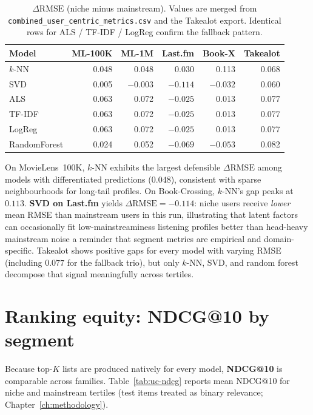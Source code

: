\begin{table}[htbp]
  \centering
  \caption{$\Delta\mathrm{RMSE}$ (niche minus mainstream). Values are merged from \texttt{combined\_user\_centric\_metrics.csv} and the Takealot export. Identical rows for ALS / TF-IDF / LogReg confirm the fallback pattern.}
  \label{tab:uc-delta-rmse}
  \begin{tabular}{@{}l rrrrr@{}}
    \toprule
    \textbf{Model} & \textbf{ML-100K} & \textbf{ML-1M} & \textbf{Last.fm} & \textbf{Book-X} & \textbf{Takealot} \\
    \midrule
    $k$-NN      & 0.048 & 0.048 & 0.030 & 0.113 & 0.068 \\
    SVD         & 0.005 & $-0.003$ & $-0.114$ & $-0.032$ & 0.060 \\
    ALS         & 0.063 & 0.072 & $-0.025$ & 0.013 & 0.077 \\
    TF-IDF     & 0.063 & 0.072 & $-0.025$ & 0.013 & 0.077 \\
    LogReg      & 0.063 & 0.072 & $-0.025$ & 0.013 & 0.077 \\
    RandomForest& 0.024 & 0.052 & $-0.069$ & $-0.053$ & 0.082 \\
    \bottomrule
  \end{tabular}
\end{table}

On MovieLens~100K, $k$-NN exhibits the largest defensible $\Delta\mathrm{RMSE}$ among models with differentiated predictions ($0.048$), consistent with sparse neighbourhoods for long-tail profiles. On Book-Crossing, $k$-NN's gap peaks at $0.113$. \textbf{SVD on Last.fm} yields $\Delta\mathrm{RMSE} = -0.114$: niche users receive \emph{lower} mean RMSE than mainstream users in this run, illustrating that latent factors can occasionally fit low-mainstreaminess listening profiles better than head-heavy mainstream noise a reminder that segment metrics are empirical and domain-specific. Takealot shows positive gaps for every model with varying RMSE (including $0.077$ for the fallback trio), but only $k$-NN, SVD, and random forest decompose that signal meaningfully across tertiles.

\section{Ranking equity: NDCG@10 by segment}
Because top-$K$ lists are produced natively for every model, \textbf{NDCG@10} is comparable across families. Table~\ref{tab:uc-ndcg} reports mean NDCG@10 for niche and mainstream tertiles (test items treated as binary relevance; Chapter~\ref{ch:methodology}).

